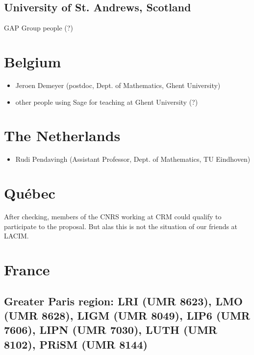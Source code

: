 \subsection*{University of St. Andrews, Scotland}
GAP Group people (?)

\section*{Belgium}

\begin{itemize}
\item Jeroen Demeyer (postdoc, Dept. of Mathematics, Ghent University)
\item other people using Sage for teaching at Ghent University (?)
\end{itemize}

\section*{The Netherlands}

\begin{itemize}
\item Rudi Pendavingh (Assistant Professor, Dept. of Mathematics, TU Eindhoven)
\end{itemize}

\section*{Québec}

After checking, members of the CNRS working at CRM could qualify to
participate to the proposal. But alas this is not the situation of our
friends at LACIM.

\section*{France}

\subsection*{Greater Paris region: LRI (UMR 8623),  LMO (UMR 8628), LIGM
  (UMR 8049), LIP6 (UMR 7606), LIPN (UMR 7030), LUTH (UMR 8102), PRiSM (UMR 8144)}



